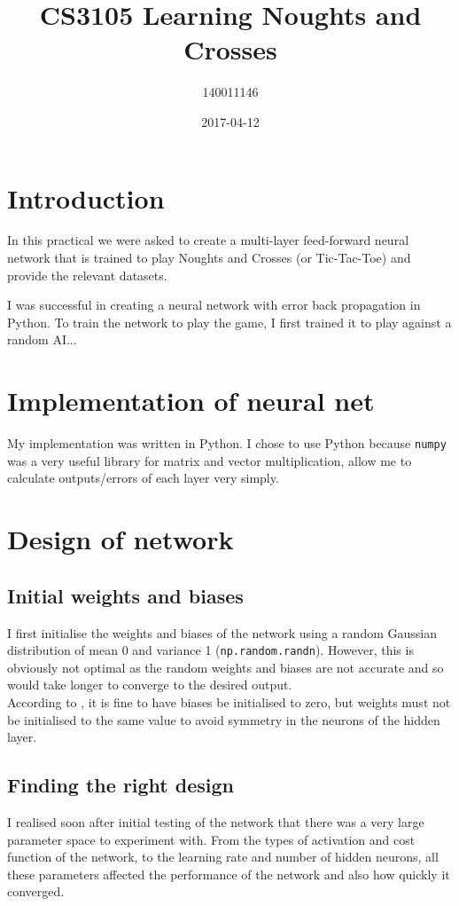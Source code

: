 \documentclass{article}
\title{CS3105 Learning Noughts and Crosses}
\date{2017-04-12}
\author{140011146}
\newcommand{\n}[0]{\\[\baselineskip]}
\begin{document}
\maketitle



\section{Introduction}
In this practical we were asked to create a multi-layer feed-forward neural network that is trained to play Noughts and Crosses (or Tic-Tac-Toe) and provide the relevant datasets.

I was successful in creating a neural network with error back propagation in Python. To train the network to play the game, I first trained it to play against a random AI...
\section{Implementation of neural net}
My implementation was written in Python. I chose to use Python because \texttt{numpy} was a very useful library for matrix and vector multiplication, allow me to calculate outputs/errors of each layer very simply. 


\section{Design of network}
\subsection{Initial weights and biases}
I first initialise the weights and biases of the network using a random Gaussian distribution of mean 0 and variance 1 (\texttt{np.random.randn}). However, this is obviously not optimal as the random weights and biases are not accurate and so would take longer to converge to the desired output. 
\n
According to \cite{DBLP}, it is fine to have biases be initialised to zero, but weights must not be initialised to the same value to avoid symmetry in the neurons of the hidden layer.

\subsection{Finding the right design}
I realised soon after initial testing of the network that there was a very large parameter space to experiment with. From the types of activation and cost function of the network, to the learning rate and number of hidden neurons, all these parameters affected the performance of the network and also how quickly it converged.
\end{document}
